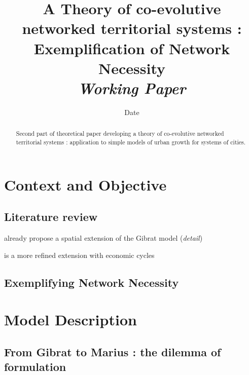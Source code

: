 


\title{A Theory of co-evolutive networked territorial systems : Exemplification of Network Necessity\bigskip\\
\textit{Working Paper}
}
\author{}
\date{Date}


\maketitle

\justify


\begin{abstract}
Second part of theoretical paper developing a theory of co-evolutive networked territorial systems : application to simple models of urban growth for systems of cities.
\end{abstract}



\section{Context and Objective}

\subsection{Literature review}

\cite{bretagnolle2000long} already propose a spatial extension of the Gibrat model (\textit{detail})

\cite{favaro2011gibrat} is a more refined extension with economic cycles



\subsection{Exemplifying Network Necessity}



\section{Model Description}

\subsection{From Gibrat to Marius : the dilemma of formulation}

